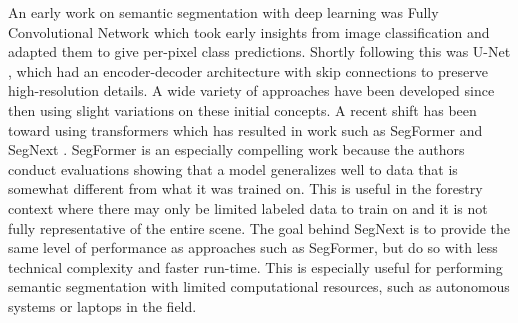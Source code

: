 An early work on semantic segmentation with deep learning was Fully Convolutional Network \cite{Shelhamer2017FullySegmentation} which took early insights from image classification and adapted them to give per-pixel class predictions. Shortly following this was U-Net \cite{RonnebergerUNET2015}, which had an encoder-decoder architecture with skip connections to preserve high-resolution details. A wide variety of approaches have been developed since then using slight variations on these initial concepts. A recent shift has been toward using transformers \cite{Vaswani2017AttentionNeed} which has resulted in work such as SegFormer \cite{Xie2021} and SegNext \cite{Guo2022SegNeXt:Segmentation}. SegFormer is an especially compelling work because the authors conduct evaluations showing that a model generalizes well to data that is somewhat different from what it was trained on. This is useful in the forestry context where there may only be limited labeled data to train on and it is not fully representative of the entire scene. The goal behind SegNext is to provide the same level of performance as approaches such as SegFormer, but do so with less technical complexity and faster run-time. This is especially useful for performing semantic segmentation with limited computational resources, such as autonomous systems or laptops in the field.


